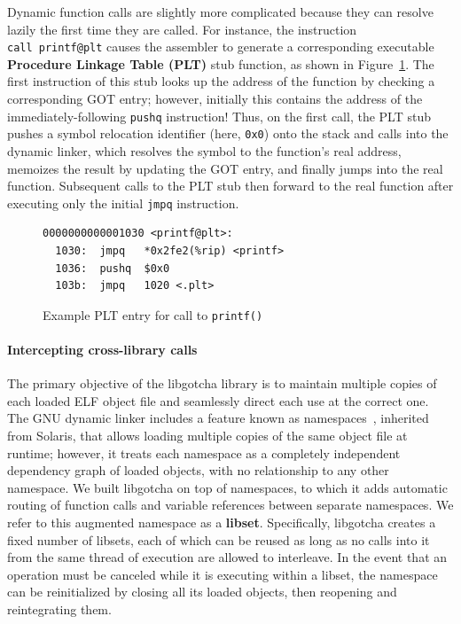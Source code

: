 Dynamic function calls are slightly more complicated because they can resolve lazily
the first time they are called.  For instance, the instruction
\texttt{call~printf@plt} causes the assembler to generate a corresponding executable
\textbf{Procedure Linkage Table (PLT)} stub function, as shown in
Figure~\ref{fig:plt}.  The first instruction of this stub looks up the address of the
function by checking a corresponding GOT entry; however, initially this contains the
address of the immediately-following \texttt{pushq} instruction!  Thus, on the first
call, the PLT stub pushes a symbol relocation identifier (here, \texttt{0x0}) onto
the stack and calls into the dynamic linker, which resolves the symbol to the
function's real address, memoizes the result by updating the GOT entry, and finally
jumps into the real function.  Subsequent calls to the PLT stub then forward to the
real function after executing only the initial \texttt{jmpq} instruction.

\begin{figure}
\begin{verbatim}
0000000000001030 <printf@plt>:
  1030:  jmpq   *0x2fe2(%rip) <printf>
  1036:  pushq  $0x0
  103b:  jmpq   1020 <.plt>
\end{verbatim}
\caption{Example PLT entry for call to \texttt{printf()}}
\label{fig:plt}
\end{figure}

\paragraph{Intercepting cross-library calls}



The primary objective of the libgotcha library is to maintain multiple copies of each
loaded ELF object file and seamlessly direct each use at the correct one.  The GNU
dynamic linker includes a feature known as namespaces~\cite{dlmopen-manpage},
inherited from Solaris, that allows loading multiple copies of the same object file
at runtime; however, it treats each namespace as a completely independent dependency
graph of loaded objects, with no relationship to any other namespace.  We built
libgotcha on top of namespaces, to which it adds automatic routing of function calls
and variable references between separate namespaces.  We refer to this augmented
namespace as a \textbf{libset}.  Specifically, libgotcha creates a fixed number of
libsets, each of which can be reused as long as no calls into it from the same thread
of execution are allowed to interleave.  In the event that an operation must be
canceled while it is executing within a libset, the namespace can be reinitialized by
closing all its loaded objects, then reopening and reintegrating them.

